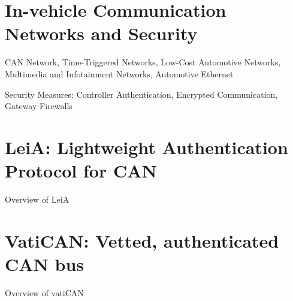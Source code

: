 

\section{In-vehicle Communication Networks and Security}
\label{sec:communication-networks}

CAN Network, Time-Triggered Networks, Low-Cost Automotive Networks, Multimedia
and Infotainment Networks, Automotive Ethernet \cite{Navet2017}

Security Measures: Controller Authentication, Encrypted Communication, Gateway
Firewalls \cite{Lemke2006}


\section{LeiA: Lightweight Authentication Protocol for CAN}

Overview of LeiA \cite{Radu2016}


\section{VatiCAN: Vetted, authenticated CAN bus}

Overview of vatiCAN \cite{Nurnberger2016}

